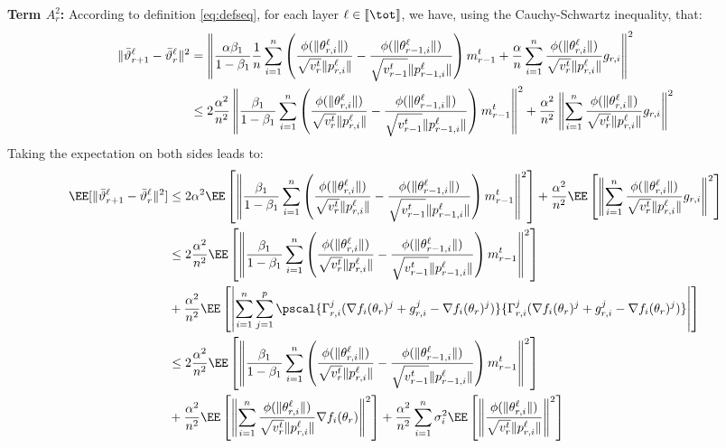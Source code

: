 \documentclass{article}
\begin{document}
\textbf{ Term $A_r^2$:}
According to definition \eqref{eq:defseq}, for each layer $\ell \in \llbracket \tot \rrbracket$, we have, using the Cauchy-Schwartz inequality, that:
\begin{align}\notag
  \| \bar{\vartheta}^\ell_{r+1} - \bar{\vartheta}^\ell_r \|^2 & = \left\| \frac{\alpha \beta_1}{1-\beta_1} \frac{1}{n}  \sum_{i = 1}^n  \left( \frac{\phi(\|\theta_{r,i}^{\ell}\|)}{\sqrt{v^{t}_{r}} \|p_{r,i}^{\ell}\|} - \frac{\phi(\|\theta_{r-1,i}^{\ell}\|)}{\sqrt{v^{t}_{r-1}} \|p_{r-1,i}^{\ell}\|} \right) m^{t}_{r-1} + \frac{\alpha}{n} \sum_{i = 1}^n \frac{\phi(\|\theta_{r,i}^{\ell}\|)}{\sqrt{v^{t}_{r}} \|p_{r,i}^{\ell}\|} g_{r,i}\right \|^2 \\\notag
&  \leq 2\frac{\alpha^2}{n^2} \left\| \frac{ \beta_1}{1-\beta_1}   \sum_{i = 1}^n  \left( \frac{\phi(\|\theta_{r,i}^{\ell}\|)}{\sqrt{v^{t}_{r}} \|p_{r,i}^{\ell}\|} - \frac{\phi(\|\theta_{r-1,i}^{\ell}\|)}{\sqrt{v^{t}_{r-1}} \|p_{r-1,i}^{\ell}\|} \right) m^{t}_{r-1}\right\|^2 + \frac{\alpha^2}{n^2} \left\| \sum_{i = 1}^n \frac{\phi(\|\theta_{r,i}^{\ell}\|)}{\sqrt{v^{t}_{r}} \|p_{r,i}^{\ell}\|} g_{r,i}\right\|^2
\end{align}
Taking the expectation on both sides leads to:
\begin{align}\label{eq:maina2}
\begin{split}
\EE[  \| \bar{\vartheta}^\ell_{r+1} - \bar{\vartheta}^\ell_r \|^2] &  \leq 2\alpha^2 \EE \left[ \left\| \frac{ \beta_1}{1-\beta_1}  \sum_{i = 1}^n  \left( \frac{\phi(\|\theta_{r,i}^{\ell}\|)}{\sqrt{v^{t}_{r}} \|p_{r,i}^{\ell}\|} - \frac{\phi(\|\theta_{r-1,i}^{\ell}\|)}{\sqrt{v^{t}_{r-1}} \|p_{r-1,i}^{\ell}\|} \right) m^{t}_{r-1}\right\|^2 \right] +  \frac{\alpha^2}{n^2} \EE\left[ \left\| \sum_{i = 1}^n \frac{\phi(\|\theta_{r,i}^{\ell}\|)}{\sqrt{v^{t}_{r}} \|p_{r,i}^{\ell}\|} g_{r,i}\right\|^2 \right]\\
& \leq 2 \frac{\alpha^2}{n^2} \EE \left[ \left\| \frac{ \beta_1}{1-\beta_1}  \sum_{i = 1}^n  \left( \frac{\phi(\|\theta_{r,i}^{\ell}\|)}{\sqrt{v^{t}_{r}} \|p_{r,i}^{\ell}\|} - \frac{\phi(\|\theta_{r-1,i}^{\ell}\|)}{\sqrt{v^{t}_{r-1}} \|p_{r-1,i}^{\ell}\|} \right) m^{t}_{r-1}\right\|^2 \right] \\
& +  \frac{\alpha^2}{n^2} \EE\left[ \left| \sum_{i = 1}^n\sum_{j = 1}^p    \pscal{\Gamma_{r,i}^j (\nabla f_i(\theta_r)^j + g_{r,i}^j - \nabla f_i(\theta_r)^j) }{\Gamma_{r,i}^j (\nabla f_i(\theta_r)^j + g_{r,i}^j - \nabla f_i(\theta_r)^j)}\right| \right]\\
& \leq 2\frac{\alpha^2}{n^2} \EE \left[ \left\| \frac{ \beta_1}{1-\beta_1}  \sum_{i = 1}^n  \left( \frac{\phi(\|\theta_{r,i}^{\ell}\|)}{\sqrt{v^{t}_{r}} \|p_{r,i}^{\ell}\|} - \frac{\phi(\|\theta_{r-1,i}^{\ell}\|)}{\sqrt{v^{t}_{r-1}} \|p_{r-1,i}^{\ell}\|} \right) m^{t}_{r-1}\right\|^2 \right] \\
& +  \frac{\alpha^2}{n^2} \EE\left[ \left\| \sum_{i = 1}^n \frac{\phi(\|\theta_{r,i}^{\ell}\|)}{\sqrt{v^{t}_{r}} \|p_{r,i}^{\ell}\|}\nabla f_i(\theta_r) \right\|^2 \right] +  \frac{\alpha^2}{n^2} \sum_{i = 1}^n  \sigma_i^2 \EE\left[ \left\|\frac{\phi(\|\theta_{r,i}^{\ell}\|)}{\sqrt{v^{t}_{r}} \|p_{r,i}^{\ell}\|} \right\|^2 \right]
\end{split}
\end{align}
\end{document}
